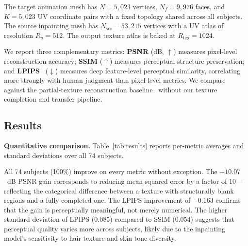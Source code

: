 \documentclass[conference]{IEEEtran}
\begin{document}
The target animation mesh has $N = 5{,}023$ vertices, $N_f = 9{,}976$ faces,
and $K = 5{,}023$ UV coordinate pairs with a fixed topology shared across all
subjects. The source inpainting mesh has $N_{\text{src}} = 53{,}215$ vertices
with a UV atlas of resolution $R_u = 512$. The output texture atlas is baked at
$R_{\text{tex}} = 1024$.

We report three complementary metrics: \textbf{PSNR} (dB, $\uparrow$) measures
pixel-level reconstruction accuracy; \textbf{SSIM} ($\uparrow$) measures
perceptual structure preservation; and \textbf{LPIPS}~\cite{zhang2018lpips}
($\downarrow$) measures deep feature-level perceptual similarity, correlating
more strongly with human judgment than pixel-level metrics. We compare against
the partial-texture reconstruction baseline~\cite{feng2021deca} without our
texture completion and transfer pipeline.

\subsection{Results}

\noindent\textbf{Quantitative comparison.}
Table~\ref{tab:results} reports per-metric averages and standard deviations
over all 74 subjects.

\begin{table}[h]
  \caption{Quantitative comparison on PolyFace (74 subjects).
           $\uparrow$: higher is better; $\downarrow$: lower is better.}
  \label{tab:results}
  \centering
\end{table}

All 74 subjects (100\%) improve on every metric without exception. The
$+10.07$~dB PSNR gain corresponds to reducing mean squared error by a factor
of 10---reflecting the categorical difference between a texture with
structurally blank regions and a fully completed one. The LPIPS improvement of
$-0.163$ confirms that the gain is perceptually meaningful, not merely
numerical. The higher standard deviation of LPIPS (0.085) compared to SSIM
(0.054) suggests that perceptual quality varies more across subjects, likely
due to the inpainting model's sensitivity to hair texture and skin tone
diversity.
\end{document}
